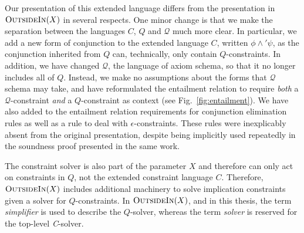 \documentclass[a4paper]{jfp}
\newcommand{\outsidein}{\textsc{OutsideIn}(X)}
\begin{document}
Our presentation of this extended language differs from the presentation in $\outsidein$ in several respects. One minor change is that we make the
separation between the languages $C$, $Q$ and $\mathcal{Q}$ much more clear. In particular, we add a new form of conjunction to the extended language
$C$, written $\phi \land' \psi$, as the conjunction inherited from $Q$ can, technically, only contain $Q$-constraints. In addition, we have changed
$\mathcal{Q}$, the language of axiom schema, so that it no longer includes all of $Q$. Instead, we make no assumptions about the forms that
$\mathcal{Q}$ schema may take, and have reformulated the entailment relation to require \emph{both} a $\mathcal{Q}$-constraint \emph{and} a
$Q$-constraint as context (see Fig.~\ref{fig:entailment}). We have also added to the entailment relation requirements for conjunction elimination
rules as well as a rule to deal with $\epsilon$-constraints. These rules were inexplicably absent from the original presentation, despite being
implicitly used repeatedly in the soundness proof presented in the same work.

The constraint solver is also part of the parameter $X$ and therefore can only act on constraints in $Q$, not the extended constraint language $C$.
Therefore, $\outsidein$ includes additional machinery to solve implication constraints given a solver for $Q$-constraints. In $\outsidein$, and in
this thesis, the term \emph{simplifier} is used to describe the $Q$-solver, whereas the term \emph{solver} is reserved for the top-level
\emph{C}-solver.

\newcommand{\nvdasharrow}[0]{\nvdash\!\!\!\!\blacktriangleright\ }
\newcommand{\vdasharrow}[0]{\vdash\!\!\!\!\blacktriangleright\ }
\end{document}
